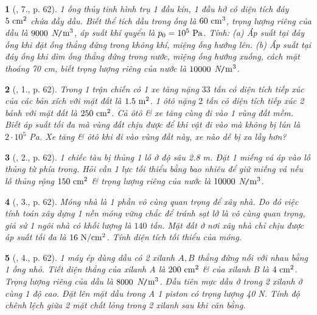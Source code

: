 \documentclass{article}
\newtheorem{baitoan}{}
\begin{document}
\begin{baitoan}[\cite{Van_Quyen_Hanh_Nhu_10_chuyen_Ly}, 7., p. 62]
	1 ống thủy tinh hình trụ 1 đầu kín, 1 đầu hở có diện tích đáy $\rm5\ cm^2$ chứa đầy dầu. Biết thể tích dầu trong ống là $\rm60\ cm^3$, trọng lượng riêng của dầu là $\rm9000$ {\rm N{\tt/}$\rm m^3$}, áp suất khí quyển là $p_0 = 10^5\ {\rm Pa}$. Tính: (a) Áp suất tại đáy ống khi đặt ống thẳng đứng trong không khí, miệng ống hướng lên. (b) Áp suất tại đáy ống khi dìm ống thẳng đứng trong nước, miệng ống hướng xuống, cách mặt thoáng {\rm70 cm}, biết trọng lượng riêng của nước là $\rm10000$ {\rm N{\tt/}$\rm m^3$}.
\end{baitoan}

\begin{baitoan}[\cite{Van_Quyen_Hanh_Nhu_10_chuyen_Ly}, 1., p. 62]
	Trong 1 trận chiến có 1 xe tăng nặng $33$ tấn có diện tích tiếp xúc của các bản xích với mặt đất là $\rm1.5\ m^2$. 1 ôtô nặng $2$ tấn có diện tích tiếp xúc 2 bánh với mặt đất là $\rm250\ cm^2$. Cả ôtô \& xe tăng cùng đi vào 1 vùng đất mềm. Biết áp suất tối đa mà vùng đất chịu được để khi vật đi vào mà không bị lún là $2\cdot10^5$ {\rm Pa}. Xe tăng \& ôtô khi đi vào vùng đất này, xe nào dễ bị xa lầy hơn?
\end{baitoan}

\begin{baitoan}[\cite{Van_Quyen_Hanh_Nhu_10_chuyen_Ly}, 2., p. 62]
	1 chiếc tàu bị thủng 1 lỗ ở độ sâu {\rm2.8 m}. Đặt 1 miếng vá áp vào lỗ thủng từ phía trong. Hỏi cần 1 lực tối thiểu bằng bao nhiêu để giữ miếng vá nếu lỗ thủng rộng $\rm150\ cm^2$ \& trọng lượng riêng của nước là $\rm10000$ {\rm N{\tt/}$\rm m^3$}.
\end{baitoan}

\begin{baitoan}[\cite{Van_Quyen_Hanh_Nhu_10_chuyen_Ly}, 3., p. 62]
	Móng nhà là 1 phần vô cùng quan trọng để xây nhà. Do đó việc tính toán xây dựng 1 nền móng vững chắc để tránh sạt lở là vô cùng quan trọng, giả sử 1 ngôi nhà có khối lượng là $140$ tấn. Mặt đất ở nơi xây nhà chỉ chịu được áp suất tối đa là $\rm16\ N{\tt/}cm^2$. Tính diện tích tối thiểu của móng.
\end{baitoan}

\begin{baitoan}[\cite{Van_Quyen_Hanh_Nhu_10_chuyen_Ly}, 4., p. 62]
	1 máy ép dùng dầu có 2 xilanh $A,B$ thẳng đứng nối với nhau bằng 1 ống nhỏ. Tiết diện thẳng của xilanh A là $\rm200\ cm^2$ \& của xilanh B là $\rm4\ cm^2$. Trọng lượng riêng của dầu là $\rm8000$ {\rm N{\tt/}$\rm m^3$}. Đầu tiên mực dầu ở trong 2 xilanh ở cùng 1 độ cao. Đặt lên mặt dầu trong A 1 piston có trọng lượng {\rm40 N}. Tính độ chênh lệch giữa 2 mặt chất lỏng trong 2 xilanh sau khi cân bằng.
\end{baitoan}
\end{document}

